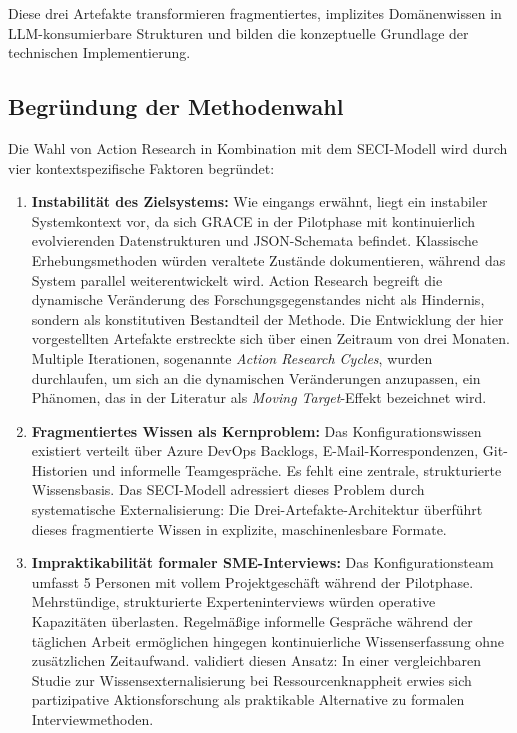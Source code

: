 Diese drei Artefakte transformieren fragmentiertes, implizites Domänenwissen in LLM-konsumierbare Strukturen und bilden die konzeptuelle Grundlage der technischen Implementierung.


\subsection{Begründung der Methodenwahl}
\label{subsec:BegruendungMethode}

Die Wahl von Action Research in Kombination mit dem SECI-Modell wird durch vier kontextspezifische Faktoren begründet:

\begin{enumerate}
    \item \textbf{Instabilität des Zielsystems:} Wie eingangs erwähnt, liegt ein instabiler Systemkontext vor, da sich GRACE in der Pilotphase mit kontinuierlich evolvierenden Datenstrukturen und JSON-Schemata befindet. Klassische Erhebungsmethoden würden veraltete Zustände dokumentieren, während das System parallel weiterentwickelt wird. Action Research begreift die dynamische Veränderung des Forschungsgegenstandes nicht als Hindernis, sondern als konstitutiven Bestandteil der Methode. Die Entwicklung der hier vorgestellten Artefakte erstreckte sich über einen Zeitraum von drei Monaten. Multiple Iterationen, sogenannte \textit{Action Research Cycles}, wurden durchlaufen, um sich an die dynamischen Veränderungen anzupassen, ein Phänomen, das in der Literatur als \textit{Moving Target}-Effekt bezeichnet wird.

    \item \textbf{Fragmentiertes Wissen als Kernproblem:} Das Konfigurationswissen existiert verteilt über Azure DevOps Backlogs, E-Mail-Korrespondenzen, Git-Historien und informelle Teamgespräche. Es fehlt eine zentrale, strukturierte Wissensbasis. Das SECI-Modell adressiert dieses Problem durch systematische Externalisierung: Die Drei-Artefakte-Architektur überführt dieses fragmentierte Wissen in explizite, maschinenlesbare Formate.

    \item \textbf{Impraktikabilität formaler SME-Interviews:} Das Konfigurationsteam umfasst 5 Personen mit vollem Projektgeschäft während der Pilotphase. Mehrstündige, strukturierte Experteninterviews würden operative Kapazitäten überlasten. Regelmäßige informelle Gespräche während der täglichen Arbeit ermöglichen hingegen kontinuierliche Wissenserfassung ohne zusätzlichen Zeitaufwand. \cite{jackson:par2010} validiert diesen Ansatz: In einer vergleichbaren Studie zur Wissensexternalisierung bei Ressourcenknappheit erwies sich partizipative Aktionsforschung als praktikable Alternative zu formalen Interviewmethoden.


\end{enumerate}
